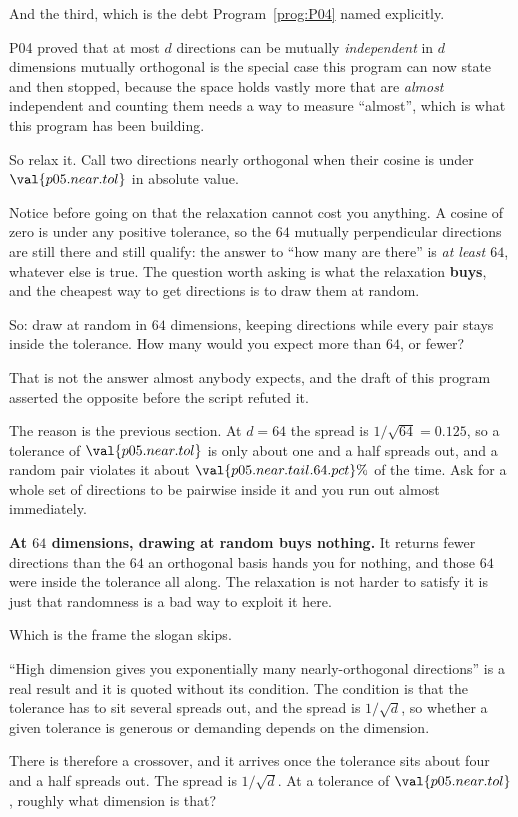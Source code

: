 \begin{fr}
And the third, which is the debt Program~\ref{prog:P04} named explicitly.

P04 proved that at most $d$ directions can be mutually \emph{independent} in
$d$ dimensions \dash{} mutually orthogonal is the special case this program can
now state \dash{} and then stopped, because the space holds vastly more that are
\emph{almost} independent and counting them needs a way to measure
\enquote{almost}, which is what this program has been building.

So relax it. Call two directions nearly orthogonal when their cosine is under
$\val{p05.near.tol}$ in absolute value.

Notice before going on that the relaxation cannot cost you anything. A cosine
of zero is under any positive tolerance, so the $64$ mutually perpendicular
directions are still there and still qualify: the answer to \enquote{how many
are there} is \emph{at least $64$}, whatever else is true. The question worth
asking is what the relaxation \textbf{buys}, and the cheapest way to get
directions is to draw them at random.

So: draw at random in $64$ dimensions, keeping directions while every pair
stays inside the tolerance. How many would you expect \dash{} more than $64$,
or fewer?
\nextframe
\end{fr}

\begin{fr}
That is not the answer almost anybody expects, and the draft of this program
asserted the opposite before the script refuted it.

The reason is the previous section. At $d = 64$ the spread is
$1/\sqrt{64} = \num{0.125}$, so a tolerance of $\val{p05.near.tol}$ is only about one
and a half spreads out, and a random pair violates it about
$\val{p05.near.tail.64.pct}\%$ of the time. Ask for a whole set of directions
to be pairwise inside it and you run out almost immediately.

\textbf{At $64$ dimensions, drawing at random buys nothing.} It returns fewer
directions than the $64$ an orthogonal basis hands you for nothing, and those
$64$ were inside the tolerance all along. The relaxation is not harder to
satisfy \dash{} it is just that randomness is a bad way to exploit it here.
\end{fr}

\begin{fr}
Which is the frame the slogan skips.

\enquote{High dimension gives you exponentially many nearly-orthogonal
directions} is a real result and it is quoted without its condition. The
condition is that the tolerance has to sit several spreads out, and the spread
is $1/\sqrt{d}$, so whether a given tolerance is generous or demanding depends
on the dimension.

There is therefore a crossover, and it arrives once the tolerance sits about
four and a half spreads out. The spread is $1/\sqrt{d}$. At a tolerance of
$\val{p05.near.tol}$, roughly what dimension is that?
\nextframe
\end{fr}

